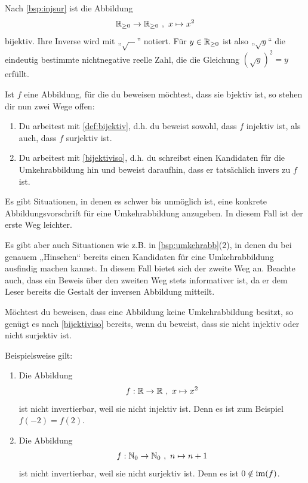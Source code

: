 \begin{bsp}
    Nach \cref{bsp:injsur} ist die Abbildung
        \[ \mathbb R_{\ge 0} \to \mathbb R_{\ge 0} \ ,\ x \mapsto x^2 \]
    bijektiv. Ihre Inverse wird mit „$\sqrt{-}$” notiert. Für $y\in \mathbb R_{\ge 0}$ ist also „$\sqrt{y}$“ die eindeutig bestimmte nichtnegative reelle Zahl, die die Gleichung $(\sqrt{y})^2=y$ erfüllt.
\end{bsp}


\begin{bem}
    Ist $f$ eine Abbildung, für die du beweisen möchtest, dass sie bjektiv ist, so stehen dir nun zwei Wege offen:
    \begin{enumerate}
        \item Du arbeitest mit \cref{def:bijektiv}, d.h. du beweist sowohl, dass $f$ injektiv ist, als auch, dass $f$ surjektiv ist.
        \item Du arbeitest mit \cref{bijektiviso}, d.h. du schreibst einen Kandidaten für die Umkehrabbildung hin und beweist daraufhin, dass er tatsächlich invers zu $f$ ist.
    \end{enumerate}
    Es gibt Situationen, in denen es schwer bis unmöglich ist, eine konkrete Abbildungsvorschrift für eine Umkehrabbildung anzugeben. In diesem Fall ist der erste Weg leichter.
    
    Es gibt aber auch Situationen wie z.B. in \cref{bsp:umkehrabb}(2), in denen du bei genauem „Hinsehen“ bereits einen Kandidaten für eine Umkehrabbildung ausfindig machen kannst. In diesem Fall bietet sich der zweite Weg an. Beachte auch, dass ein Beweis über den zweiten Weg stets informativer ist, da er dem Leser bereits die Gestalt der inversen Abbildung mitteilt.
\end{bem}


\begin{bem} \label{invwiderleg}
    Möchtest du beweisen, dass eine Abbildung keine Umkehrabbildung besitzt, so genügt es nach \cref{bijektiviso} bereits, wenn du beweist, dass sie nicht injektiv oder nicht surjektiv ist.
\end{bem}


\begin{bsp}
    Beispielsweise gilt:
    \begin{enumerate}
        \item Die Abbildung
            \[ f : \R \to \R \ ,\ x\mapsto x^2\]
        ist nicht invertierbar, weil sie nicht injektiv ist. Denn es ist zum Beispiel $f(-2)=f(2)$.
        \item Die Abbildung
            \[ f : \N_0 \to \N_0 \ ,\ n \mapsto n+1 \]
        ist nicht invertierbar, weil sie nicht surjektiv ist. Denn es ist $0\notin \operatorname{im}(f)$.
    \end{enumerate}
\end{bsp}





